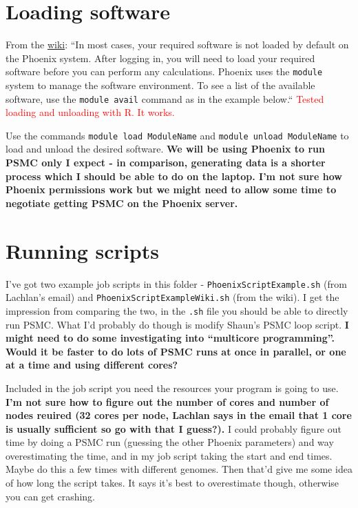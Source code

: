 \documentclass[a4]{article}
\begin{document}
\section{Loading software}
From the \href{https://wiki.adelaide.edu.au/hpc/index.php/Getting_Started_Guide}{wiki}: ``In most cases, your required software is not loaded by default on the Phoenix system. After logging in, you will need to load your required software before you can perform any calculations. Phoenix uses the \texttt{module} system to manage the software environment. To see a list of the available software, use the \texttt{module avail} command as in the example below.`` \textcolor{red}{Tested loading and unloading with R. It works.}

Use the commands \texttt{module load ModuleName} and \texttt{module unload ModuleName} to load and unload the desired software. \textbf{We will be using Phoenix to run PSMC only I expect - in comparison, generating data is a shorter process which I should be able to do on the laptop. I'm not sure how Phoenix permissions work but we might need to allow some time to negotiate getting PSMC on the Phoenix server.}

\section{Running scripts}
I've got two example job scripts in this folder - \texttt{PhoenixScriptExample.sh} (from Lachlan's email) and \texttt{PhoenixScriptExampleWiki.sh} (from the wiki). I get the impression from comparing the two, in the \texttt{.sh} file you should be able to directly run PSMC. What I'd probably do though is modify Shaun's PSMC loop script. \textbf{I might need to do some investigating into ``multicore programming''. Would it be faster to do lots of PSMC runs at once in parallel, or one at a time and using different cores?}

Included in the job script you need the resources your program is going to use. \textbf{I'm not sure how to figure out the number of cores and number of nodes reuired (32 cores per node, Lachlan says in the email that 1 core is usually sufficient so go with that I guess?).} I could probably figure out time by doing a PSMC run (guessing the other Phoenix parameters) and way overestimating the time, and in my job script taking the start and end times. Maybe do this a few times with different genomes. Then that'd give me some idea of how long the script takes. It says it's best to overestimate though, otherwise you can get crashing.
\end{document}
